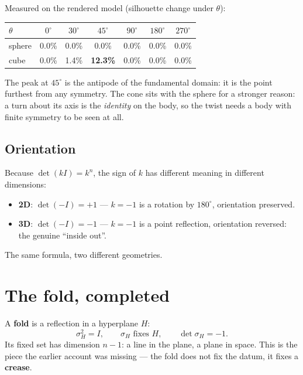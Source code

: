 \documentclass[11pt,fleqn]{article}
\begin{document}
Measured on the rendered model (silhouette change under $\theta$):

\begin{table}[H]
\centering
\begin{tabular}{@{}lcccccc@{}}
\toprule
$\theta$ & $0^\circ$ & $30^\circ$ & $45^\circ$ & $90^\circ$ & $180^\circ$ & $270^\circ$ \\
\midrule
sphere & 0.0\% & 0.0\% & 0.0\% & 0.0\% & 0.0\% & 0.0\% \\
cube & 0.0\% & 1.4\% & \textbf{12.3\%} & 0.0\% & 0.0\% & 0.0\% \\
\bottomrule
\end{tabular}
\end{table}

The peak at $45^\circ$ is the antipode of the fundamental domain: it is the point furthest from any
symmetry. The cone sits with the sphere for a stronger reason: a turn about its axis is the
\emph{identity} on the body, so the twist needs a body with finite symmetry to be seen at all.

\subsection*{Orientation}

Because $\det(kI) = k^n$, the sign of $k$ has different meaning in different dimensions:

\begin{itemize}
\item \textbf{2D}: $\det(-I) = +1$ --- $k = -1$ is a rotation by $180^\circ$, orientation
preserved.
\item \textbf{3D}: $\det(-I) = -1$ --- $k = -1$ is a point reflection, orientation reversed: the
genuine ``inside out''.
\end{itemize}

The same formula, two different geometries.

\section{The fold, completed}

A \textbf{fold} is a reflection in a hyperplane $H$:
\begin{equation}
\sigma_H^2 = I, \qquad \sigma_H \text{ fixes } H, \qquad \det\sigma_H = -1.
\end{equation}
Its fixed set has dimension $n - 1$: a line in the plane, a plane in space. This is the piece the
earlier account was missing --- the fold does not fix the datum, it fixes a \textbf{crease}.
\end{document}
